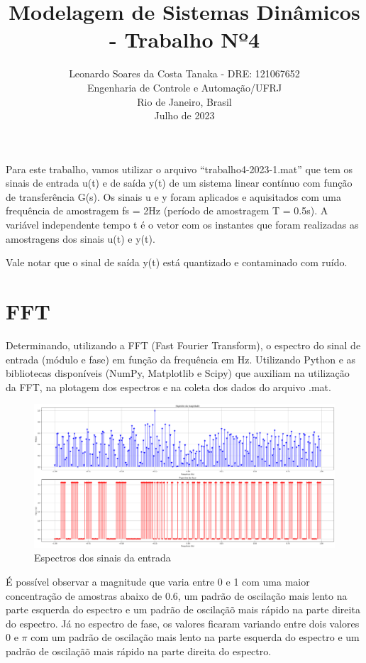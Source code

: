\documentclass[10pt]{article}
\title{Modelagem de Sistemas Dinâmicos - Trabalho Nº4}
\author{
    Leonardo Soares da Costa Tanaka - DRE: 121067652 \\
    Engenharia de Controle e Automação/UFRJ \\
    Rio de Janeiro, Brasil \\
    Julho de 2023
}
\date{}
\begin{document}
\maketitle
\thispagestyle{capa}

\quad Para este trabalho, vamos utilizar o arquivo “trabalho4-2023-1.mat” que tem os sinais de entrada u(t) e de saída y(t) de um sistema
linear contínuo com função de transferência G(s). Os sinais u e y foram aplicados e aquisitados
com uma frequência de amostragem fs = 2Hz (período de amostragem T = 0.5s). A variável
independente tempo t é o vetor com os instantes que foram realizadas as amostragens dos
sinais u(t) e y(t).

\quad Vale notar que o sinal de saída y(t) está quantizado e contaminado com ruído.

\section{FFT}

\quad Determinando, utilizando a FFT (Fast Fourier Transform), o espectro do sinal de entrada
(módulo e fase) em função da frequência em Hz. Utilizando Python e as bibliotecas disponíveis
(NumPy, Matplotlib e Scipy) que auxiliam na utilização da FFT, na plotagem dos espectros e
na coleta dos dados do arquivo .mat.

\begin{figure}[h]
    \centering
    \includegraphics[scale=0.27]{fft.png}
    \caption{Espectros dos sinais da entrada}
\end{figure}

\quad É possível observar a magnitude que varia entre 0 e 1
com uma maior concentração de amostras abaixo de 0.6,
um padrão de oscilação mais lento na parte esquerda do espectro e
um padrão de oscilaçãõ mais rápido na parte direita do espectro.
Já no espectro de fase, os valores ficaram variando entre dois valores 0 e $\pi$
com um padrão de oscilação mais lento na parte esquerda do espectro e
um padrão de oscilaçãõ mais rápido na parte direita do espectro.
\end{document}
